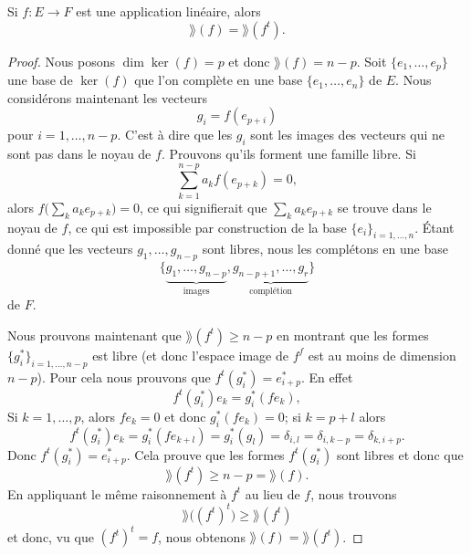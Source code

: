 \begin{lemma}   \label{LemSEpTcW}
    Si \( f\colon E\to F\) est une application linéaire, alors
    \begin{equation}
        \rang(f)=\rang(f^t).
    \end{equation}
\end{lemma}

\begin{proof}
    Nous posons \( \dim\ker(f)=p\) et donc \( \rang(f)=n-p\). Soit \( \{ e_1,\ldots, e_p \}\) une base de \( \ker(f)\) que l'on complète en une base \( \{ e_1,\ldots, e_n \}\) de \( E\). Nous considérons maintenant les vecteurs
    \begin{equation}
        g_i=f(e_{p+i})
    \end{equation}
    pour \( i=1,\ldots, n-p\). C'est à dire que les \( g_i\) sont les images des vecteurs qui ne sont pas dans le noyau de \( f\). Prouvons qu'ils forment une famille libre. Si
    \begin{equation}
        \sum_{k=1}^{n-p}a_kf(e_{p+k})=0,
    \end{equation}
    alors \( f\big( \sum_ka_ke_{p+k} \big)=0\), ce qui signifierait que \( \sum_ka_ke_{p+k}\) se trouve dans le noyau de \( f\), ce qui est impossible par construction de la base \( \{ e_i \}_{i=1,\ldots, n}\). Étant donné que les vecteurs \( g_1,\ldots, g_{n-p}\) sont libres, nous les complétons en une base
    \begin{equation}
        \{ \underbrace{g_1,\ldots, g_{n-p}}_{\text{images}},\underbrace{g_{n-p+1},\ldots, g_r}_{\text{complétion}} \}
    \end{equation}
    de \( F\).

    Nous prouvons maintenant que \( \rang(f^t)\geq n-p\) en montrant que les formes \( \{ g_i^* \}_{i=1,\ldots, n-p}\) est libre (et donc l'espace image de \( f^f\) est au moins de dimension \( n-p\)). Pour cela nous prouvons que \( f^t(g_i^*)=e^*_{i+p}\). En effet
    \begin{equation}
        f^t(g^*_i)e_k=g_i^*(fe_k),
    \end{equation}
    Si \( k=1,\ldots, p\), alors \( fe_k=0\) et donc \( g_i^*(fe_k)=0\); si \( k=p+l\) alors
    \begin{equation}
        f^t(g_i^*)e_k=g_i^*(fe_{k+l})=g^*_i(g_l)=\delta_{i,l}=\delta_{i,k-p}=\delta_{k,i+p}.
    \end{equation}
    Donc \( f^t(g_i^*)=e^*_{i+p}\). Cela prouve que les formes \( f^t(g_i^*)\) sont libres et donc que
    \begin{equation}
        \rang(f^t)\geq n-p=\rang(f).
    \end{equation}
    En appliquant le même raisonnement à \( f^t\) au lieu de \( f\), nous trouvons
    \begin{equation}
        \rang\big( (f^t)^t \big)\geq \rang(f^t)
    \end{equation}
    et donc, vu que \( (f^t)^t=f\), nous obtenons \( \rang(f)=\rang(f^t)\).
    
\end{proof}

